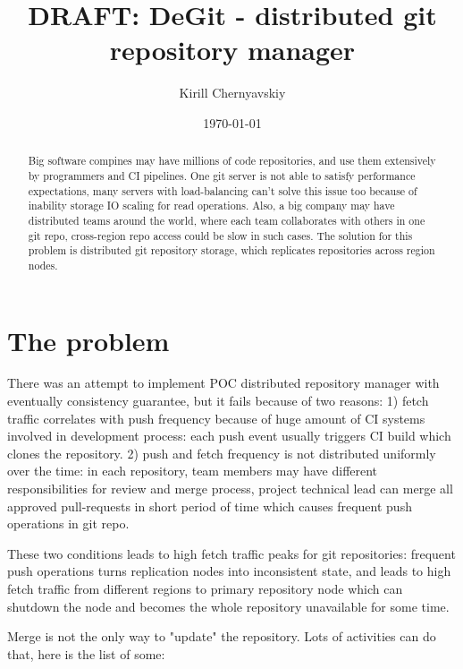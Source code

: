 \documentclass[12pt,oneside]{article}
\date{\small\today}
\title{%
  DRAFT: DeGit - distributed git repository manager\\
  \colorbox{firebrick}{\small\sffamily\color{white}{White Paper}}}
\author{Kirill Chernyavskiy}
\begin{document}
\raggedbottom

\maketitle
\begin{abstract}
Big software compines may have millions of code repositories,
and use them extensively by programmers and CI pipelines.
One git server is not able to satisfy performance expectations,
many servers with load-balancing can't solve this issue too because
of inability storage IO scaling for read operations.
Also, a big company may have distributed teams around the world,
where each team collaborates with others in one git repo,
cross-region repo access could be slow in such cases.
The solution for this problem is distributed git repository storage,
which replicates repositories across region nodes.
\end{abstract}


\section{The problem}

There was an attempt to implement POC distributed repository manager with
eventually consistency guarantee, but it fails because of two reasons:
1) fetch traffic correlates with push frequency because of huge amount of
CI systems involved in development process: each push event usually triggers
CI build which clones the repository.
2) push and fetch frequency is not distributed uniformly over the time: in each
repository, team members may have different responsibilities for review and merge process,
project technical lead can merge all approved pull-requests in short period of time
which causes frequent push operations in git repo.

These two conditions leads to high fetch traffic peaks for git repositories:
frequent push operations turns replication nodes into inconsistent state,
and leads to high fetch traffic from different regions to primary repository node
which can shutdown the node and becomes the whole repository unavailable for some time.

Merge is not the only way to "update" the repository. Lots of activities can do that,
here is the list of some:
\end{document}
